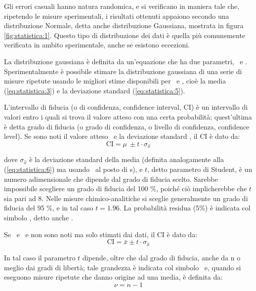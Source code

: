 Gli errori casuali hanno natura randomica, e si verificano in maniera tale che, ripetendo le misure sperimentali, i risultati ottenuti appaiono secondo una distribuzione Normale, detta anche distribuzione Gaussiana, mostrata in figura \ref{fig:statistica:1}. Questo tipo di distribuzione dei dati è quella più comunemente verificata in ambito sperimentale, anche se esistono eccezioni.

La distribuzione gaussiana è definita da un'equazione che ha due parametri, \mu\ e \sigma. Sperimentalmente è possibile stimare la distribuzione gaussiana di una serie di misure ripetute usando le migliori stime disponibili per \mu\ e \sigma, cioè la media (\ref{eq:statistica:3}) e la deviazione standard (\ref{eq:statistica:5}).

L'intervallo di fiducia (o di confidenza, confidence interval, $\mathrm{CI}$) è un intervallo di valori entro i quali si trova il valore atteso con una certa probabilità; quest'ultima è detta grado di fiducia (o grado di confidenza, o livello di confidenza, confidence level). Se sono noti il valore atteso \mu\ e la deviazione standard \sigma, il $\mathrm{CI}$ è dato da:
\begin{equation} \label{eq:statistica:8}
\mathrm{CI} = \mu\ \pm t\cdot \sigma_{\hat{x}}
\end{equation}

dove $\sigma_{\hat{x}}$ è la deviazione standard della media (definita analogamente alla (\ref{eq:statistica:6}) ma usando \sigma\ al posto di s), e $t$, detto parametro di Student, è un numero adimensionale che dipende dal grado di fiducia scelto. Sarebbe impossibile scegliere un grado di fiducia del 100 \%, poiché ciò implicherebbe che $t$ sia pari ad 8. Nelle misure chimico-analitiche si sceglie generalmente un grado di fiducia del 95 \%, e in tal caso $t = 1.96$. La probabilità residua (5\%) è indicata col simbolo \alpha, detto anche .



Se \mu\ e \sigma\ e non sono noti ma solo stimati dai dati, il CI è dato da:
\begin{equation} \label{eq:statistica:9}
\mathrm{CI} = \bar{x} \pm t\cdot \sigma_{\hat{x}}
\end{equation}

In tal caso il parametro $t$ dipende, oltre che dal grado di fiducia, anche da n o meglio dai gradi di libertà; tale grandezza è indicata col simbolo \nu\ e, quando si eseguono misure ripetute che danno origine ad una media, è definita da:
\begin{equation} \label{eq:statistica:10}
\nu = n - 1
\end{equation}

